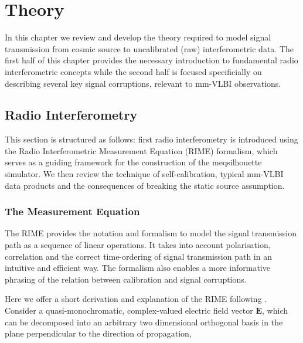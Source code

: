 \chapter{Theory}\label{chap:theory}
In this chapter we review and develop the theory required to model signal transmission from cosmic source to uncalibrated (raw) interferometric data. The first half of this chapter provides the necessary introduction to fundamental radio interferometric concepts while the second half is focused specificially on describing several key signal corruptions, relevant to mm-VLBI observations. 

\section{Radio Interferometry}\label{sec:radio_int}

This section is structured as follows: first radio interferometry is introduced using the Radio Interferometric Measurement Equation (RIME) formalism, which serves as a guiding framework for the construction of the {\sc meqsilhouette} simulator. We then review the technique of self-calibration, typical mm-VLBI data products and the consequences of breaking the static source assumption.

\subsection{The Measurement Equation}\label{sec:RIME}

The RIME provides the notation and formalism to model the signal transmission path as a sequence of linear operations. It takes into account polarisation, correlation and the correct time-ordering of signal transmission path in an intuitive and efficient way. The formalism also enables a more informative phrasing of the relation between calibration and signal corruptions.


Here we offer a short derivation and explanation of the RIME following \citet{Smirnov_2011a}. Consider a quasi-monochromatic, complex-valued electric field vector $\bm{E}$, which can be decomposed into an arbitrary two dimensional orthogonal basis in the plane perpendicular to the direction of propagation,

